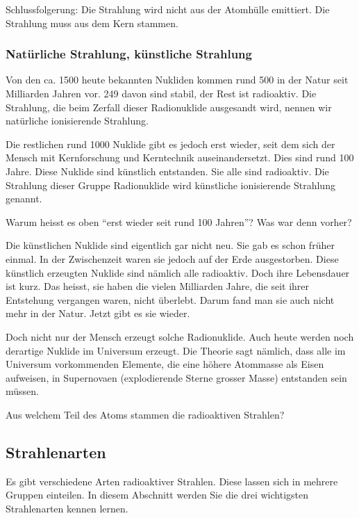 \documentclass[12pt,a4paper,twoside]{article}
\begin{document}
Schlussfolgerung: Die Strahlung wird nicht aus der Atomhülle emittiert. Die Strahlung muss aus dem Kern stammen.

\subsubsection*{Natürliche Strahlung, künstliche Strahlung}

Von den ca. 1500 heute bekannten Nukliden kommen rund 500 in der Natur seit Milliarden Jahren vor. 
249 davon sind stabil, der Rest ist radioaktiv. Die Strahlung, die beim Zerfall dieser Radionuklide
ausgesandt wird, nennen wir natürliche ionisierende Strahlung.

Die restlichen rund 1000 Nuklide gibt es jedoch erst wieder,
seit dem sich der Mensch mit Kernforschung und Kerntechnik auseinandersetzt. 
Dies sind rund 100 Jahre. Diese Nuklide sind künstlich entstanden. Sie alle sind radioaktiv. Die Strahlung dieser Gruppe Radionuklide wird künstliche ionisierende Strahlung genannt.

Warum heisst es oben ``erst wieder seit rund 100 Jahren''? Was war denn vorher?

Die künstlichen Nuklide sind eigentlich gar nicht neu. Sie gab es schon früher einmal. 
In der Zwischenzeit waren sie jedoch auf der Erde ausgestorben. Diese künstlich erzeugten Nuklide
sind nämlich alle radioaktiv. Doch ihre Lebensdauer ist kurz. Das heisst, sie haben die vielen Milliarden Jahre,
die seit ihrer Entstehung vergangen waren, nicht überlebt.
Darum fand man sie auch nicht mehr in der Natur. Jetzt gibt es sie wieder.

Doch nicht nur der Mensch erzeugt solche Radionuklide. Auch heute werden noch derartige Nuklide im Universum erzeugt.
Die Theorie sagt nämlich, dass alle im Universum vorkommenden Elemente, die eine höhere Atommasse als Eisen aufweisen,
in Supernovaen (explodierende Sterne grosser Masse) entstanden sein müssen.

\begin{aufgabe}
Aus welchem Teil des Atoms stammen die radioaktiven Strahlen?
\end{aufgabe}


\subsection*{Strahlenarten}


Es gibt verschiedene Arten radioaktiver Strahlen. 
Diese lassen sich in mehrere Gruppen einteilen. 
In diesem Abschnitt werden Sie die drei wichtigsten Strahlenarten kennen lernen.
\end{document}
